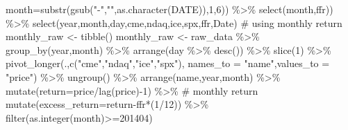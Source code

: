 \documentclass[
  a4paper,
  DIV=11,
  numbers=noendperiod]{scrreprt}
\newenvironment{Shaded}{\begin{snugshade}}{\end{snugshade}}
\newcommand{\AttributeTok}[1]{\textcolor[rgb]{0.40,0.45,0.13}{#1}}
\newcommand{\CommentTok}[1]{\textcolor[rgb]{0.37,0.37,0.37}{#1}}
\newcommand{\DecValTok}[1]{\textcolor[rgb]{0.68,0.00,0.00}{#1}}
\newcommand{\FunctionTok}[1]{\textcolor[rgb]{0.28,0.35,0.67}{#1}}
\newcommand{\NormalTok}[1]{\textcolor[rgb]{0.00,0.23,0.31}{#1}}
\newcommand{\OtherTok}[1]{\textcolor[rgb]{0.00,0.23,0.31}{#1}}
\newcommand{\SpecialCharTok}[1]{\textcolor[rgb]{0.37,0.37,0.37}{#1}}
\newcommand{\StringTok}[1]{\textcolor[rgb]{0.13,0.47,0.30}{#1}}
\begin{document}
\begin{Shaded}
\begin{Highlighting}[]
                     \AttributeTok{month=}\FunctionTok{substr}\NormalTok{(}\FunctionTok{gsub}\NormalTok{(}\StringTok{"{-}"}\NormalTok{,}\StringTok{""}\NormalTok{,}\FunctionTok{as.character}\NormalTok{(DATE)),}\DecValTok{1}\NormalTok{,}\DecValTok{6}\NormalTok{)) }\SpecialCharTok{\%\textgreater{}\%} 
              \FunctionTok{select}\NormalTok{(month,ffr)) }\SpecialCharTok{\%\textgreater{}\%} 
  \FunctionTok{select}\NormalTok{(year,month,day,cme,ndaq,ice,spx,ffr,Date)}
\CommentTok{\# using monthly return}
\NormalTok{monthly\_raw }\OtherTok{\textless{}{-}} \FunctionTok{tibble}\NormalTok{()}
\NormalTok{monthly\_raw }\OtherTok{\textless{}{-}}\NormalTok{ raw\_data }\SpecialCharTok{\%\textgreater{}\%} 
  \FunctionTok{group\_by}\NormalTok{(year,month) }\SpecialCharTok{\%\textgreater{}\%} 
  \FunctionTok{arrange}\NormalTok{(day }\SpecialCharTok{\%\textgreater{}\%} \FunctionTok{desc}\NormalTok{()) }\SpecialCharTok{\%\textgreater{}\%} 
  \FunctionTok{slice}\NormalTok{(}\DecValTok{1}\NormalTok{) }\SpecialCharTok{\%\textgreater{}\%} 
  \FunctionTok{pivot\_longer}\NormalTok{(.,}\FunctionTok{c}\NormalTok{(}\StringTok{"cme"}\NormalTok{,}\StringTok{"ndaq"}\NormalTok{,}\StringTok{"ice"}\NormalTok{,}\StringTok{"spx"}\NormalTok{),}
               \AttributeTok{names\_to =} \StringTok{"name"}\NormalTok{,}\AttributeTok{values\_to =} \StringTok{"price"}\NormalTok{) }\SpecialCharTok{\%\textgreater{}\%} 
  \FunctionTok{ungroup}\NormalTok{() }\SpecialCharTok{\%\textgreater{}\%} 
  \FunctionTok{arrange}\NormalTok{(name,year,month) }\SpecialCharTok{\%\textgreater{}\%} 
  \FunctionTok{mutate}\NormalTok{(}\AttributeTok{return=}\NormalTok{price}\SpecialCharTok{/}\FunctionTok{lag}\NormalTok{(price)}\SpecialCharTok{{-}}\DecValTok{1}\NormalTok{) }\SpecialCharTok{\%\textgreater{}\%}  \CommentTok{\# monthly return}
  \FunctionTok{mutate}\NormalTok{(}\AttributeTok{excess\_return=}\NormalTok{return}\SpecialCharTok{{-}}\NormalTok{ffr}\SpecialCharTok{*}\NormalTok{(}\DecValTok{1}\SpecialCharTok{/}\DecValTok{12}\NormalTok{)) }\SpecialCharTok{\%\textgreater{}\%} 
  \FunctionTok{filter}\NormalTok{(}\FunctionTok{as.integer}\NormalTok{(month)}\SpecialCharTok{\textgreater{}=}\DecValTok{201404}\NormalTok{)}


\end{Highlighting}
\end{Shaded}
\end{document}
